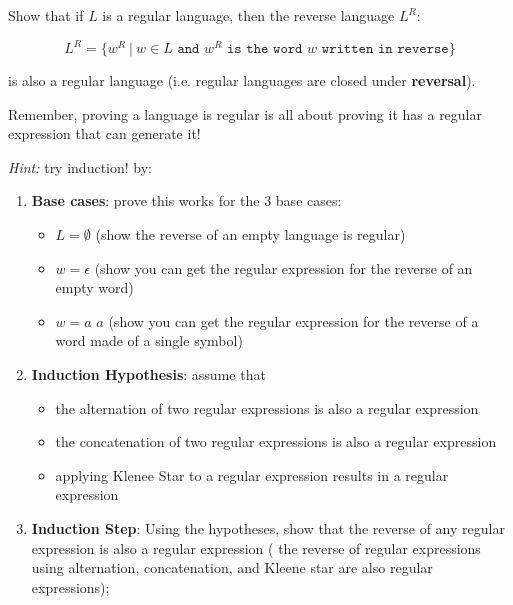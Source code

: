 \documentclass[12pt]{article}
\newenvironment{exercise}[2][Exercise]{\begin{trivlist}
\item[\hskip \labelsep {\bfseries #1}\hskip \labelsep {\bfseries #2.}]}{\end{trivlist}}
\begin{document}
\begin{exercise}{4}

Show that if $L$ is a regular language, then the reverse language $L^R$:

$$L^R = \{w^R \ | \ w\in L \texttt{ and } w^R \texttt{ is the word } w \texttt{ written in reverse}\}$$

is also a regular language (i.e. regular languages are closed under \textbf{reversal}).

Remember, proving a language is regular is all about proving it has a regular expression that can generate it!

{\Large \textit{Hint: }}
 try induction! by:
\begin{enumerate}
    \item \textbf{Base cases}: prove this works for the 3 base cases:
    \begin{itemize}
        \item $L =\emptyset$ (show the reverse of an empty language is regular)
        \item $w=\epsilon$ (show you can get the regular expression for the reverse of an empty word)
        \item $w=a$  $a$ (show you can get the regular expression for the reverse of a word made of a single symbol)
    \end{itemize}
    \item\textbf{ Induction Hypothesis}: assume that  
    \begin{itemize}
        \item the alternation of two regular expressions is also a regular expression
        \item the concatenation of two regular expressions is also a regular expression
        \item applying Klenee Star to a regular expression results in a regular expression
    \end{itemize}

    \item \textbf{Induction Step}: Using the hypotheses, show that the reverse of any regular expression is also a regular expression (
    the reverse of regular expressions using alternation, concatenation, and Kleene star are also regular expressions); 
\end{enumerate}

\end{exercise}
\end{document}
